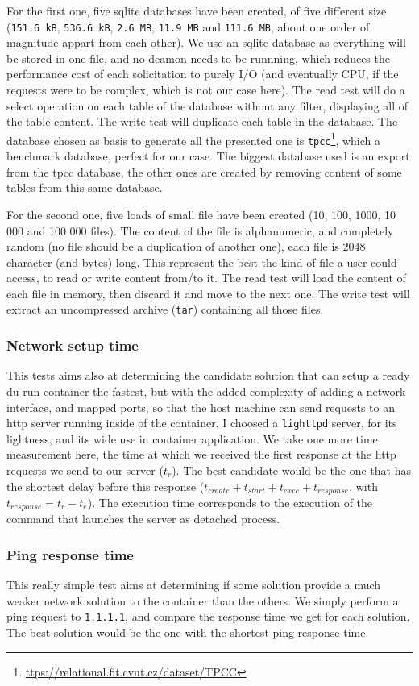 For the first one, five sqlite databases have been created, of five different size (\texttt{151.6 kB}, \texttt{536.6 kB}, \texttt{2.6 MB}, \texttt{11.9 MB} and \texttt{111.6 MB}, about one order of magnitude appart from each other).  We use an sqlite database as everything will be stored in one file, and no deamon needs to be runnning, which reduces the performance cost of each solicitation to purely I/O (and eventually CPU, if the requests were to be complex, which is not our case here).
The read test will do a select operation on each table of the database without any filter, displaying all of the table content.  The write test will duplicate each table in the database.  The database chosen as basis to generate all the presented one is \texttt{tpcc}\footnote{\href{https://relational.fit.cvut.cz/dataset/TPCC}{ttps://relational.fit.cvut.cz/dataset/TPCC}}, which a benchmark database, perfect for our case.  The biggest database used is an export from the tpcc database, the other ones are created by removing content of some tables from this same database.

For the second one, five loads of small file have been created (10, 100, 1000, 10 000 and 100 000 files).  The content of the file is alphanumeric, and completely random (no file should be a duplication of another one), each file is $2048$ character (and bytes) long.  This represent the best the kind of file a user could access, to read or write content from/to it. 
The read test will load the content of each file in memory, then discard it and move to the next one.  The write test will extract an uncompressed archive (\texttt{tar}) containing all those files.

\subsubsection{Network setup time}
This tests aims also at determining the candidate solution that can setup a ready du run container the fastest, but with the added complexity of adding a network interface, and mapped ports, so that the host machine can send requests to an http server running inside of the container.  I choosed a \texttt{lighttpd} server, for its lightness, and its wide use in container application.  We take one more time measurement here, the time at which we received the first response at the http requests we send to our server ($t_r$).  The best candidate would be the one that has the shortest delay before this response ($t_{create} + t_{start} + t_{exec} + t_{response}$, with $t_{response}=t_r - t_e$).  The execution time corresponds to the execution of the command that launches the server as detached process.

\subsubsection{Ping response time}
This really simple test aims at determining if some solution provide a much weaker network solution to the container than the others.  We simply perform a ping request to \texttt{1.1.1.1}, and compare the response time we get for each solution.  The best solution would be the one with the shortest ping response time.
